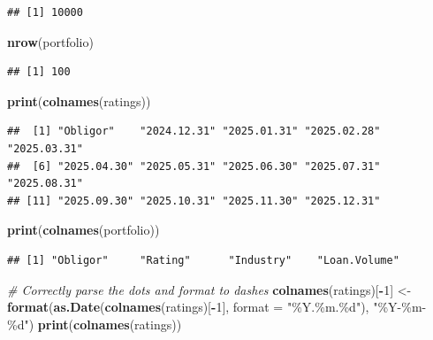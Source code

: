\documentclass[
  11pt,
]{article}
\newenvironment{Shaded}{\begin{snugshade}}{\end{snugshade}}
\newcommand{\AttributeTok}[1]{\textcolor[rgb]{0.13,0.29,0.53}{#1}}
\newcommand{\CommentTok}[1]{\textcolor[rgb]{0.56,0.35,0.01}{\textit{#1}}}
\newcommand{\DecValTok}[1]{\textcolor[rgb]{0.00,0.00,0.81}{#1}}
\newcommand{\FunctionTok}[1]{\textcolor[rgb]{0.13,0.29,0.53}{\textbf{#1}}}
\newcommand{\NormalTok}[1]{#1}
\newcommand{\OtherTok}[1]{\textcolor[rgb]{0.56,0.35,0.01}{#1}}
\newcommand{\SpecialCharTok}[1]{\textcolor[rgb]{0.81,0.36,0.00}{\textbf{#1}}}
\newcommand{\StringTok}[1]{\textcolor[rgb]{0.31,0.60,0.02}{#1}}
\begin{document}
\begin{verbatim}
## [1] 10000
\end{verbatim}

\begin{Shaded}
\begin{Highlighting}[]
\FunctionTok{nrow}\NormalTok{(portfolio)}
\end{Highlighting}
\end{Shaded}

\begin{verbatim}
## [1] 100
\end{verbatim}

\begin{Shaded}
\begin{Highlighting}[]
\FunctionTok{print}\NormalTok{(}\FunctionTok{colnames}\NormalTok{(ratings))}
\end{Highlighting}
\end{Shaded}

\begin{verbatim}
##  [1] "Obligor"    "2024.12.31" "2025.01.31" "2025.02.28" "2025.03.31"
##  [6] "2025.04.30" "2025.05.31" "2025.06.30" "2025.07.31" "2025.08.31"
## [11] "2025.09.30" "2025.10.31" "2025.11.30" "2025.12.31"
\end{verbatim}

\begin{Shaded}
\begin{Highlighting}[]
\FunctionTok{print}\NormalTok{(}\FunctionTok{colnames}\NormalTok{(portfolio))}
\end{Highlighting}
\end{Shaded}

\begin{verbatim}
## [1] "Obligor"     "Rating"      "Industry"    "Loan.Volume"
\end{verbatim}

\begin{Shaded}
\begin{Highlighting}[]
\CommentTok{\# Correctly parse the dots and format to dashes}
\FunctionTok{colnames}\NormalTok{(ratings)[}\SpecialCharTok{{-}}\DecValTok{1}\NormalTok{] }\OtherTok{\textless{}{-}} \FunctionTok{format}\NormalTok{(}\FunctionTok{as.Date}\NormalTok{(}\FunctionTok{colnames}\NormalTok{(ratings)[}\SpecialCharTok{{-}}\DecValTok{1}\NormalTok{], }\AttributeTok{format =} \StringTok{"\%Y.\%m.\%d"}\NormalTok{), }\StringTok{"\%Y{-}\%m{-}\%d"}\NormalTok{)}
\FunctionTok{print}\NormalTok{(}\FunctionTok{colnames}\NormalTok{(ratings))}
\end{Highlighting}
\end{Shaded}
\end{document}
